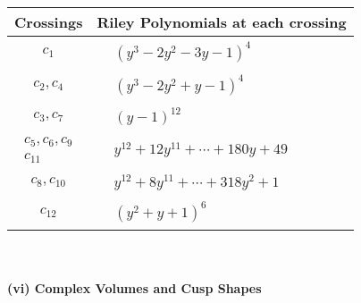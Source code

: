 \documentclass[1p]{elsarticle_modified}
\theoremstyle{definition}
\begin{document}
\begin{tabular}{m{50pt}|m{274pt}}
Crossings & \hspace{64pt}Riley Polynomials at each crossing \\
\hline $$\begin{aligned}c_{1}\end{aligned}$$&$\begin{aligned}
&(y^3-2 y^2-3 y-1)^4
\end{aligned}$\\
\hline $$\begin{aligned}c_{2},c_{4}\end{aligned}$$&$\begin{aligned}
&(y^3-2 y^2+y-1)^4
\end{aligned}$\\
\hline $$\begin{aligned}c_{3},c_{7}\end{aligned}$$&$\begin{aligned}
&(y-1)^{12}
\end{aligned}$\\
\hline $$\begin{aligned}c_{5},c_{6},c_{9}\\c_{11}\end{aligned}$$&$\begin{aligned}
&y^{12}+12 y^{11}+\cdots+180 y+49
\end{aligned}$\\
\hline $$\begin{aligned}c_{8},c_{10}\end{aligned}$$&$\begin{aligned}
&y^{12}+8 y^{11}+\cdots+318 y^2+1
\end{aligned}$\\
\hline $$\begin{aligned}c_{12}\end{aligned}$$&$\begin{aligned}
&(y^2+y+1)^6
\end{aligned}$\\
\hline
\end{tabular}\\~\\
\newpage\flushleft \textbf{(vi) Complex Volumes and Cusp Shapes}
\end{document}
